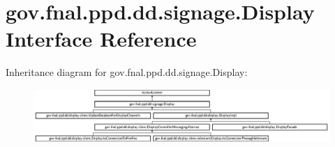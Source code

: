 \hypertarget{interfacegov_1_1fnal_1_1ppd_1_1dd_1_1signage_1_1Display}{\section{gov.\-fnal.\-ppd.\-dd.\-signage.\-Display Interface Reference}
\label{interfacegov_1_1fnal_1_1ppd_1_1dd_1_1signage_1_1Display}
}
Inheritance diagram for gov.\-fnal.\-ppd.\-dd.\-signage.\-Display\-:\begin{figure}[H]
\begin{center}
\leavevmode
\includegraphics[height=2.015839cm]{interfacegov_1_1fnal_1_1ppd_1_1dd_1_1signage_1_1Display}
\end{center}
\end{figure}
